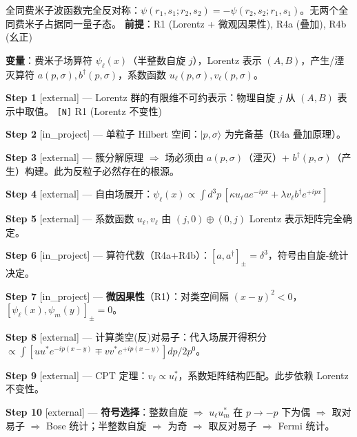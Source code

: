 
\begin{lawbox}
  全同费米子波函数完全反对称：$\psi(r_1,s_1;r_2,s_2)=-\psi(r_2,s_2;r_1,s_1)$。无两个全同费米子占据同一量子态。
  \quad\textbf{前提}：R1 (Lorentz + 微观因果性), R4a (叠加), R4b (幺正)
\end{lawbox}

\noindent\textbf{变量}：费米子场算符 $\psi_\ell(x)$（半整数自旋 $j$），Lorentz 表示 $(A,B)$，产生/湮灭算符 $a(p,\sigma), b^\dagger(p,\sigma)$，系数函数 $u_\ell(p,\sigma), v_\ell(p,\sigma)$。

\begin{derivationbox}

\noindent\textbf{Step 1} [external] — Lorentz 群的有限维不可约表示：物理自旋 $j$ 从 $(A,B)$ 表示中取值。
\hfill\texttt{[N]} R1 (Lorentz 不变性)

\noindent\textbf{Step 2} [in\_project] — 单粒子 Hilbert 空间：$|p,\sigma\rangle$ 为完备基（R4a 叠加原理）。

\noindent\textbf{Step 3} [external] — 簇分解原理 $\Rightarrow$ 场必须由 $a(p,\sigma)$（湮灭）+ $b^\dagger(p,\sigma)$（产生）构建。此为反粒子必然存在的根源。

\noindent\textbf{Step 4} [external] — 自由场展开：$\psi_\ell(x) \propto \int d^3p\,[\kappa u_\ell a e^{-ipx} + \lambda v_\ell b^\dagger e^{+ipx}]$

\noindent\textbf{Step 5} [external] — 系数函数 $u_\ell, v_\ell$ 由 $(j,0)\oplus(0,j)$ Lorentz 表示矩阵完全确定。

\noindent\textbf{Step 6} [in\_project] — 算符代数（R4a+R4b）：$[a,a^\dagger]_\pm = \delta^3$，符号由自旋-统计决定。

\noindent\textbf{Step 7} [in\_project] — \textbf{微因果性}（R1）：对类空间隔 $(x-y)^2<0$，$[\psi_\ell(x),\psi_m(y)]_\pm=0$。

\noindent\textbf{Step 8} [external] — 计算类空(反)对易子：代入场展开得积分 $\propto \int[uu^*e^{-ip(x-y)}\mp vv^*e^{+ip(x-y)}]dp/2p^0$。

\noindent\textbf{Step 9} [external] — CPT 定理：$v_\ell \propto u^*_\ell$，系数矩阵结构匹配。此步依赖 Lorentz 不变性。

\noindent\textbf{Step 10} [external] — \textbf{符号选择}：整数自旋 $\Rightarrow$ $u_\ell u^*_m$ 在 $p\to-p$ 下为偶 $\Rightarrow$ 取对易子 $\Rightarrow$ Bose 统计；半整数自旋 $\Rightarrow$ 为奇 $\Rightarrow$ 取反对易子 $\Rightarrow$ Fermi 统计。


\end{derivationbox}

